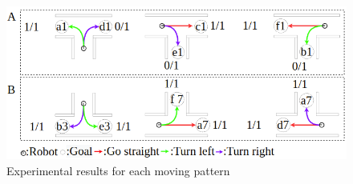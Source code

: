 \begin{figure}[hbtp]
  \centering
 \includegraphics[keepaspectratio, scale=0.45]
      {images/real_model3.png}
 \caption{Experimental results for each moving pattern}
 \label{Fig:real_model3}
\end{figure}

\newpage
